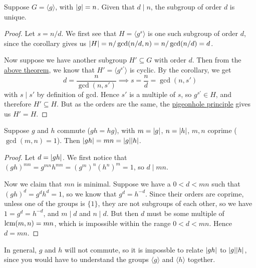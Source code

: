 \begin{theorem}\label{thm:cyclic-subgroup-uniqueness}
    Suppose \(G = \langle g \rangle\), with \(\abs{g} = n\).
    Given that \(d \mid n\), the subgroup of order \(d\) is unique.
\end{theorem}
\begin{proof}
    Let \(s = n/d\).
    We first see that \(H = \langle g^s \rangle\)
    is one such subgroup of order \(d\),
    since the corollary gives us
    \(\abs{H} = n/\gcd(n/d,n) = n/\gcd(n/d) = d\).

    Now suppose we have another subgroup \(H' \subseteq G\)
    with order \(d\).
    Then from the \hyperref[thm:cyclic-subgroup]{above theorem},
    we know that \(H' = \langle g^{s'} \rangle\) is cyclic.
    By the corollary, we get
    \begin{equation*}
        d = \frac{n}{\gcd(n,s')} \implies s = \frac{n}{d} = \gcd(n,s')
    \end{equation*}
    with \(s \mid s'\) by definition of gcd.
    Hence \(s'\) is a multiple of \(s\),
    so \(g^{s'} \in H\), and therefore \(H' \subseteq H\).
    But as the orders are the same,
    the \hyperref[thm:pigeonhole]{pigeonhole principle} gives us \(H' = H\).
\end{proof}

\begin{theorem}
    Suppose \(g\) and \(h\) commute (\(gh = hg\)),
    with \(m = \abs{g}\), \(n = \abs{h}\),
    \(m,n\) coprime (\(\gcd(m,n) = 1\)).
    Then \(\abs{gh} = mn = \abs{g}\abs{h}\).
\end{theorem}
\begin{proof}
    Let \(d = \abs{gh}\).
    We first notice that
    \({(gh)}^{mn} = g^{mn}h^{mn} = {(g^m)}^n{(h^n)}^m = 1\),
    so \(d \mid mn\).

    Now we claim that \(mn\) is minimal.
    Suppose we have a \(0 < d < mn\) such that \({(gh)}^d = g^d h^d = 1\),
    so we know that \(g^d = h^{-d}\).
    Since their orders are coprime,
    unless one of the groups is \(\{1\}\),
    they are not subgroups of each other,
    so we have \(1 = g^d = h^{-d}\),
    and \(m \mid d\) and \(n \mid d\).
    But then \(d\) must be some multiple of \(\operatorname{lcm}(m,n) = mn\),
    which is impossible within the range \(0 < d < mn\).
    Hence \(d = mn\).
\end{proof}
\begin{remark}
    In general, \(g\) and \(h\) will not commute,
    so it is impossble to relate \(\abs{gh}\) to \(\abs{g}\abs{h}\),
    since you would have to understand the groups
    \(\langle g \rangle\) and \(\langle h \rangle\) together.
\end{remark}


